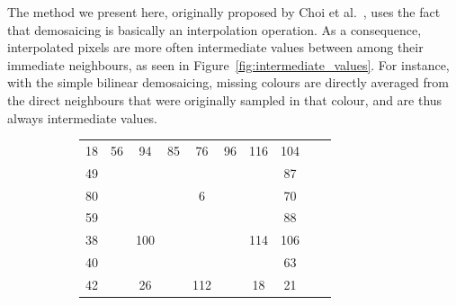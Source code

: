 \documentclass{ipol}
\begin{document}
The method we present here, originally proposed by Choi et al.~\cite{choi}, uses the fact that demosaicing is basically an interpolation operation. As a consequence, interpolated pixels are more often intermediate values between among their immediate neighbours, as seen in Figure~\ref{fig:intermediate_values}. For instance, with the simple bilinear demosaicing, missing colours are directly averaged from the direct neighbours that were originally sampled in that colour, and are thus always intermediate values. 

\begin{figure}[ht]
        \centering
        \begin{subfigure}[t]{.5\linewidth}
                \centering
                \begin{tabular}{cccccccccc}
                        18 & \textcolor{c2}{56} & 94 & \textcolor{c2}{85} & 76 & \textcolor{c2}{96} & 116 & \textcolor{c2}{104}\\
                        \textcolor{c2}{49} & \cellcolor{c0!50}{\textcolor{c2}{56}} & \cellcolor{c0!50}{\textcolor{c2}{63}} & \cellcolor{c0!50}{\textcolor{c2}{52}} & \cellcolor{c0!50}{\textcolor{c2}{41}} & \cellcolor{c0!50}{\textcolor{c2}{64}} & \cellcolor{c0!50}{\textcolor{c2}{88}} & \textcolor{c2}{87}\\
                        80 & \cellcolor{c0!50}{\textcolor{c2}{56}} & \cellcolor{c0!50}{32} & \cellcolor{c0!50}{\textcolor{c2}{19}} & 6 & \cellcolor{c0!50}{\textcolor{c2}{33}} & \cellcolor{c0!50}{60} & \textcolor{c2}{70}\\
                        \textcolor{c2}{59} & \cellcolor{c0!50}{\textcolor{c2}{62}} & \cellcolor{c0!50}{\textcolor{c2}{66}} & \cellcolor{c0!50}{\textcolor{c2}{49}} & \cellcolor{c0!50}{\textcolor{c2}{32}} & \cellcolor{c0!50}{\textcolor{c2}{59}} & \cellcolor{c0!50}{\textcolor{c2}{87}} & \textcolor{c2}{88}\\
                        38 & \cellcolor{c0!50}{\textcolor{c2}{69}} & 100 & \cellcolor{c0!50}{\textcolor{c2}{79}} & \cellcolor{c0!50}{58} & \cellcolor{c0!50}{\textcolor{c2}{86}} & 114 & \textcolor{c2}{106}\\
                        \textcolor{c2}{40} & \cellcolor{c0!50}{\textcolor{c2}{51}} & \cellcolor{c0!50}{\textcolor{c2}{63}} & \cellcolor{c0!50}{\textcolor{c2}{74}} & \cellcolor{c0!50}{\textcolor{c2}{85}} & \cellcolor{c0!50}{\textcolor{c2}{75}} & \cellcolor{c0!50}{\textcolor{c2}{66}} & \textcolor{c2}{63}\\
                        42 & \cellcolor{c0!50}{\textcolor{c2}{34}} & 26 & \cellcolor{c0!50}{\textcolor{c2}{69}} & 112 & \cellcolor{c0!50}{\textcolor{c2}{65}} & 18 & \textcolor{c2}{21}\\

\end{tabular}
\end{subfigure}
\end{figure}
\end{document}
